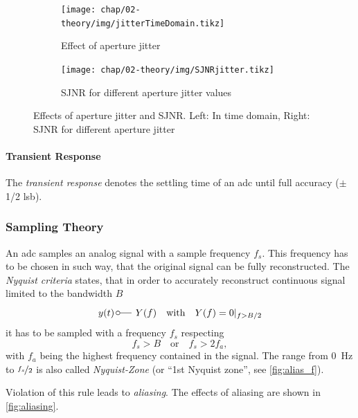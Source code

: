 \begin{figure}[tbh]
	\centering
	\begin{subfigure}{0.48\textwidth}
		\centering
		\texttt{[image: chap/02-theory/img/jitterTimeDomain.tikz]}  
		\caption{Effect of aperture jitter}
		\label{fig:jitter}
	\end{subfigure}
	\hfill
	\begin{subfigure}{0.48\textwidth}
		\centering
		\texttt{[image: chap/02-theory/img/SJNRjitter.tikz]}  
		\caption{SJNR for different aperture jitter values}
		\label{fig:sjnr}
	\end{subfigure}
	\caption[Aperture jitter and SJNR]{Effects of aperture jitter and SJNR. Left: In time domain, Right: SJNR for different aperture jitter \cite{Lundberg}}
	\label{fig:ap_jit}
\end{figure}

\paragraph{Transient Response}
The \textit{transient response} denotes the settling time of an \gls{adc} until full accuracy ($\pm$ 1/2 \gls{lsb}).


\subsubsection{Sampling Theory}
An \gls{adc} samples an analog signal with a sample frequency $f_s$.
This frequency has to be chosen in such way, that the original signal can be fully reconstructed.
The \textit{Nyquist criteria} states, that in order to accurately reconstruct continuous signal limited to the bandwidth $B$
\begin{equation}
	y (t) \, \fourier  Y(f) \quad \text{with} \quad Y(f)=0\vert_{f>B/2}
\end{equation} %
it has to be sampled with a frequency $f_s$ respecting
\begin{equation} \label{eq:nyquist}
	f_s > B \quad \text{or} \quad f_s > 2 f_a,
\end{equation}
with $f_a$ being the highest frequency contained in the signal. \cite{walt,puente2015}
The range from \SI{0}{\Hz} to $\nicefrac{f_s}{2}$ is also called \textit{Nyquist-Zone} (or ``1st Nyquist zone'', see \autoref{fig:alias_f}).

Violation of this rule leads to \textit{aliasing}.
The effects of aliasing are shown in \autoref{fig:aliasing}.

